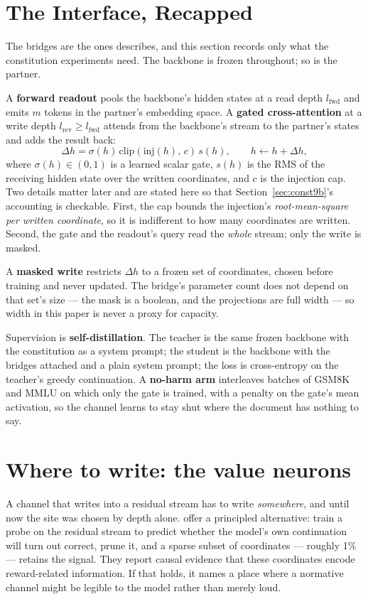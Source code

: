 \documentclass[11pt]{article}
\newcommand{\companion}{\citet{furui2026psilm}}
\begin{document}
\section{The Interface, Recapped}
\label{sec:interface2}

The bridges are the ones \companion{} describes, and this section records only what the constitution experiments need. The backbone is frozen throughout; so is the partner.

A \textbf{forward readout} pools the backbone's hidden states at a read depth $l_{\mathrm{fwd}}$ and emits $m$ tokens in the partner's embedding space. A \textbf{gated cross-attention} at a write depth $l_{\mathrm{rev}} \ge l_{\mathrm{fwd}}$ attends from the backbone's stream to the partner's states and adds the result back:
\[
  \Delta h = \sigma(h)\,\mathrm{clip}(\mathrm{inj}(h),\,c)\,s(h),
  \qquad
  h \leftarrow h + \Delta h ,
\]
where $\sigma(h) \in (0,1)$ is a learned scalar gate, $s(h)$ is the RMS of the receiving hidden state over the written coordinates, and $c$ is the injection cap. Two details matter later and are stated here so that Section~\ref{sec:const9b}'s accounting is checkable. First, the cap bounds the injection's \emph{root-mean-square per written coordinate}, so it is indifferent to how many coordinates are written. Second, the gate and the readout's query read the \emph{whole} stream; only the write is masked.

A \textbf{masked write} restricts $\Delta h$ to a frozen set of coordinates, chosen before training and never updated. The bridge's parameter count does not depend on that set's size --- the mask is a boolean, and the projections are full width --- so width in this paper is never a proxy for capacity.

Supervision is \textbf{self-distillation}. The teacher is the same frozen backbone with the constitution as a system prompt; the student is the backbone with the bridges attached and a plain system prompt; the loss is cross-entropy on the teacher's greedy continuation. A \textbf{no-harm arm} interleaves batches of GSM8K and MMLU on which only the gate is trained, with a penalty on the gate's mean activation, so the channel learns to stay shut where the document has nothing to say.
\section{Where to write: the value neurons}
\label{sec:valueneurons}

A channel that writes into a residual stream has to write \emph{somewhere}, and until now the site was chosen by depth alone. \citet{xu2026valueneurons} offer a principled alternative: train a probe on the residual stream to predict whether the model's own continuation will turn out correct, prune it, and a sparse subset of coordinates --- roughly 1\% --- retains the signal. They report causal evidence that these coordinates encode reward-related information. If that holds, it names a place where a normative channel might be legible to the model rather than merely loud.
\end{document}
